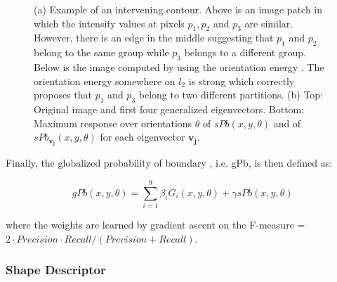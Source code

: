 \documentclass{SMBV12}
\begin{document}
\begin{figure}[htbp]
    \centering
    \caption{(a) Example of an intervening contour. Above is an image patch in which the intensity values at pixels $p_1, p_2$ and $p_3$ are similar. However, there is an edge in the middle suggesting that $p_1$ and $p_2$ belong to the same group while $p_3$ belongs to a different group. Below is the image computed by using the orientation energy \cite{leung1998contour}. The orientation energy somewhere on $l_2$ is strong which correctly proposes that $p_1$ and $p_3$ belong to two different partitions. (b) Top: Original image and first four generalized eigenvectors. Bottom: Maximum response over orientations $\theta$ of $sPb(x, y, \theta)$ and of $sPb_{\mathbf{v_j}}(x, y, \theta)$ for each eigenvector $\mathbf{v_j}$.}
\end{figure}

Finally, the globalized probability of boundary , i.e. gPb, is then defined as:

\begin{equation}
gPb(x, y, \theta) = \sum\limits_{i = 1}^{9}\beta_i G_i(x, y, \theta) + \gamma sPb(x, y, \theta)
\end{equation}

where the weights are learned by gradient ascent on the F-measure = $2\cdot Precision \cdot Recall/(Precision + Recall)$.

\subsubsection{Shape Descriptor}
\end{document}
